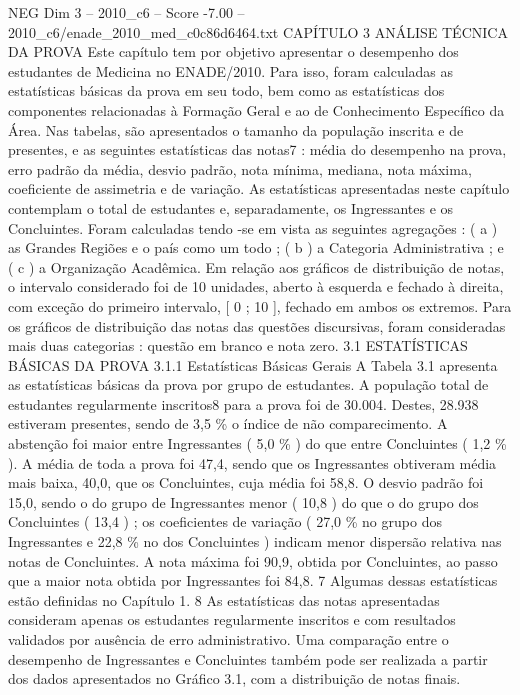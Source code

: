 \begin{textsample}{NEG Dim 3 – 2010\_c6 – Score -7.00 – 2010\_c6/enade\_2010\_med\_c0c86d6464.txt}  \label{ex:f3_neg_007}
CAPÍTULO 3 ANÁLISE TÉCNICA DA PROVA Este capítulo tem por objetivo apresentar o desempenho dos estudantes de Medicina no ENADE/2010.
Para isso, foram calculadas as estatísticas básicas da prova em seu todo, bem como as estatísticas dos componentes relacionadas à Formação Geral e ao de Conhecimento Específico da Área.
Nas tabelas, são apresentados o tamanho da população inscrita e de presentes, e as seguintes estatísticas das notas7 : média do desempenho na prova, erro padrão da média, desvio padrão, nota mínima, mediana, nota máxima, coeficiente de assimetria e de variação.
As estatísticas apresentadas neste capítulo contemplam o total de estudantes e, separadamente, os Ingressantes e os Concluintes.
Foram calculadas tendo -se em vista as seguintes agregações : ( a ) as Grandes Regiões e o país como um todo ; ( b ) a Categoria Administrativa ; e ( c ) a Organização Acadêmica.
Em relação aos gráficos de distribuição de notas, o intervalo considerado foi de 10 unidades, aberto à esquerda e fechado à direita, com exceção do primeiro intervalo, [ 0 ; 10 ], fechado em ambos os extremos.
Para os gráficos de distribuição das notas das questões discursivas, foram consideradas mais duas categorias : questão em branco e nota zero. 3.1 ESTATÍSTICAS BÁSICAS DA PROVA 3.1.1 Estatísticas Básicas Gerais A Tabela 3.1 apresenta as estatísticas básicas da prova por grupo de estudantes.
A população total de estudantes regularmente inscritos8 para a prova foi de 30.004.
Destes, 28.938 estiveram presentes, sendo de 3,5 \% o índice de não comparecimento.
A abstenção foi maior entre Ingressantes ( 5,0 \% ) do que entre Concluintes ( 1,2 \% ).
A média de toda a prova foi 47,4, sendo que os Ingressantes obtiveram média mais baixa, 40,0, que os Concluintes, cuja média foi 58,8.
O desvio padrão foi 15,0, sendo o do grupo de Ingressantes menor ( 10,8 ) do que o do grupo dos Concluintes ( 13,4 ) ; os coeficientes de variação ( 27,0 \% no grupo dos Ingressantes e 22,8 \% no dos Concluintes ) indicam menor dispersão relativa nas notas de Concluintes.
A nota máxima foi 90,9, obtida por Concluintes, ao passo que a maior nota obtida por Ingressantes foi 84,8. 7 Algumas dessas estatísticas estão definidas no Capítulo 1. 8 As estatísticas das notas apresentadas consideram apenas os estudantes regularmente inscritos e com resultados validados por ausência de erro administrativo.
Uma comparação entre o desempenho de Ingressantes e Concluintes também pode ser realizada a partir dos dados apresentados no Gráfico 3.1, com a distribuição de notas finais.

\end{textsample}
